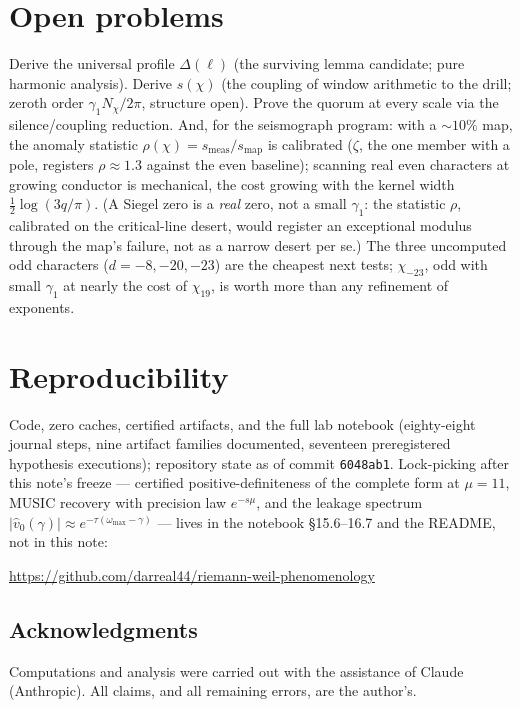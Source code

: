 \documentclass[10pt]{article}
\begin{document}
\section{Open problems}

Derive the universal profile $\Delta(\ell)$ (the surviving lemma
candidate; pure harmonic analysis). Derive $s(\chi)$ (the coupling of
window arithmetic to the drill; zeroth order $\gamma_1N_\chi/2\pi$,
structure open). Prove the quorum at every scale via the
silence/coupling reduction. And, for the seismograph program: with a
$\sim\!10\%$ map, the anomaly statistic $\rho(\chi)=
s_{\mathrm{meas}}/s_{\mathrm{map}}$ is calibrated ($\zeta$, the one
member with a pole, registers $\rho\approx1.3$ against the even
baseline); scanning real even characters at growing conductor is
mechanical, the cost growing with the kernel width
$\tfrac12\log(3q/\pi)$. (A Siegel zero is a \emph{real} zero, not a
small $\gamma_1$: the statistic $\rho$, calibrated on the critical-line
desert, would register an exceptional modulus through the map's failure,
not as a narrow desert per se.) The three uncomputed odd characters
($d=-8,-20,-23$) are the cheapest next tests; $\chi_{-23}$, odd with
small $\gamma_1$ at nearly the cost of $\chi_{19}$, is worth more than
any refinement of exponents.

\section*{Reproducibility}
Code, zero caches, certified artifacts, and the full lab notebook
(eighty-eight journal steps, nine artifact families documented,
seventeen preregistered hypothesis executions); repository state as of
commit \texttt{6048ab1}. Lock-picking after this note's freeze ---
certified positive-definiteness of the complete form at $\mu=11$,
MUSIC recovery with precision law $e^{-s\mu}$, and the leakage
spectrum $|\hat v_0(\gamma)|\approx e^{-\tau(\omega_{\max}-\gamma)}$ ---
lives in the notebook \S15.6--16.7 and the README, not in this note:
\begin{center}
\url{https://github.com/darreal44/riemann-weil-phenomenology}
\end{center}

\subsection*{Acknowledgments}
Computations and analysis were carried out with the assistance of Claude
(Anthropic). All claims, and all remaining errors, are the author's.
\end{document}
